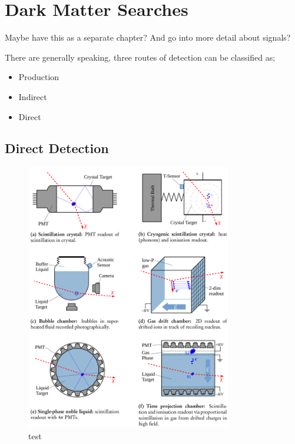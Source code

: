 \section{Dark Matter Searches}
\par
Maybe have this as a separate chapter? And go into more detail about signals?

\par
There are generally speaking, three routes of detection can be classified as;

\begin{itemize}
    \item Production
    \item Indirect
    \item Direct
\end{itemize}
    
    

\subsection{Direct Detection}

\begin{figure}[!htbp]%
    \centering
    \includegraphics[width=0.8\textwidth]{Figures/DarkMatterEvidence/direct_detection_methods.png}
    \caption[Schematics of signal readouts from direct detectors]{test}
    \label{fig:SearchMethods_Direct_Detection}
\end{figure}

